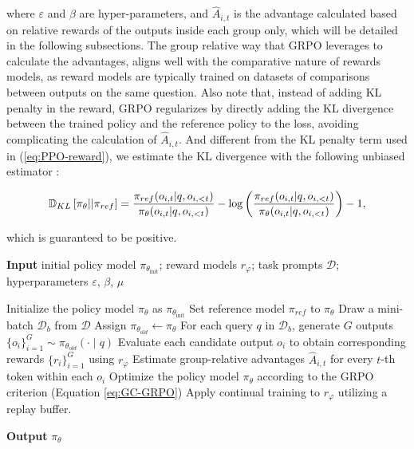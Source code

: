 \begin{itemize}[topsep=0pt]
\begin{itemize}[topsep=0pt]
where $\varepsilon$ and $\beta$ are hyper-parameters, and $\hat{A}_{i,t}$  is the advantage calculated based on relative rewards of the outputs inside each group only, which will be detailed in the following subsections. The group relative way that GRPO leverages to calculate the advantages, aligns well with the comparative nature of rewards models,  as reward models are typically trained on datasets of comparisons between outputs on the same question. Also note that, instead of adding KL penalty in the reward, GRPO regularizes by directly adding the KL divergence between the trained policy and the reference policy to the loss, avoiding complicating the calculation of  $\hat{A}_{i,t}$. And different from the KL penalty term used in (\ref{eq:PPO-reward}), we estimate the KL divergence with the following unbiased estimator \citep{kl_approx}:

\begin{equation}
\small
    \mathbb{D}_{KL}\left[\pi_{\theta} || \pi_{ref}\right] = \frac{\pi_{ref}(o_{i,t}|q,o_{i,<t})}{\pi_{\theta}(o_{i,t}|q,o_{i,<t})} - \log\left(\frac{\pi_{ref}(o_{i,t}|q,o_{i,<t})}{\pi_{\theta}(o_{i,t}|q,o_{i,<t})}\right) - 1,
\end{equation}

which is guaranteed to be positive.

\begin{algorithm}[t]
  \small
  \caption{Iterative Group Relative Policy Optimization}
  \textbf{Input} initial policy model $\pi_{\theta_{\text{init}}}$; reward models $r_\varphi$; task prompts $\mathcal{D}$; 
  hyperparameters $\varepsilon$, $\beta$, $\mu$
  \begin{algorithmic}[1]
    \State Initialize the policy model $\pi_\theta$ as $\pi_{\theta_{\text{init}}}$
       \State Set reference model $\pi_{ref}$ to $\pi_\theta$
      \State Draw a mini-batch $\mathcal{D}_b$ from $\mathcal{D}$
      \State Assign $\pi_{\theta_{old}} \gets \pi_\theta$
      \State For each query $q$ in $\mathcal{D}_b$, generate $G$ outputs $\{o_i\}_{i=1}^G \sim \pi_{\theta_{old}} (\cdot \mid q) $
      \State Evaluate each candidate output $o_i$ to obtain corresponding rewards $\{r_i\}_{i=1}^{G}$ using $r_{\varphi}$
      \State Estimate group-relative advantages $\hat{A}_{i,t}$ for every $t$-th token within each $o_i$
        \State Optimize the policy model $\pi_\theta$ according to the GRPO criterion (Equation \ref{eq:GC-GRPO})
      \EndFor
    \EndFor 
    \State Apply continual training to $r_\varphi$ utilizing a replay buffer.
    \EndFor 
  \end{algorithmic}
  \textbf{Output} $\pi_\theta$
  \label{alg:iter-grpo}
\end{algorithm}


\end{itemize}
\end{itemize}
